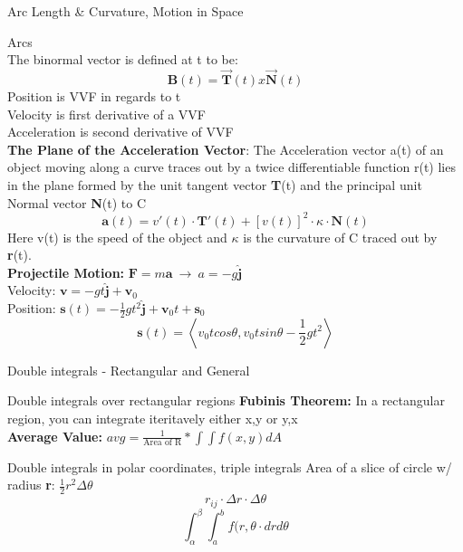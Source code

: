 \documentclass[a4paper, 12pt]{article}
\begin{document}
\begin{section}{Arc Length \& Curvature, Motion in Space}
\begin{subsection}{Arcs}
\begin{equation}
\end{equation}
The binormal vector is defined at t to be:
\begin{equation} 
	\textbf{B}(t)=\vec{\textbf{T}}(t) x \vec{\textbf{N}}(t)
\end{equation}
Position is VVF in regards to t\\
Velocity is first derivative of a VVF\\
Acceleration is second derivative of VVF\\
\textbf{The Plane of the Acceleration Vector}: The Acceleration vector a(t) of an object moving
along a curve traces out by a twice differentiable function r(t) lies in the plane formed by
the unit tangent vector \textbf{T}(t) and the principal unit Normal vector \textbf{N}(t) to C
\begin{equation} 
\textbf{a}(t)=v'(t)\cdot \textbf{T}'(t)+\left[v(t)\right]^{2}\cdot\kappa\cdot\textbf{N}(t)
\end{equation}
Here v(t) is the speed of the object and $\kappa$ is the curvature of C traced out by 
\textbf{r}(t).\\
\textbf{Projectile Motion:} $\textbf{F}=m\textbf{a} ~\to~a=-g\hat{\textbf{j}}$\\
Velocity: $\textbf{v}=-gt\hat{\textbf{j}}+\textbf{v}_{0}$ \\
Position: $\textbf{s}(t)=-\frac{1}{2}gt^{2}\hat{\textbf{j}}+\textbf{v}_{0}t+\textbf{s}_{0}$\\
\begin{equation} 
	\textbf{s}(t)=\left<v_0tcos\theta,v_0tsin\theta-\frac{1}{2}gt^{2}\right>
\end{equation}
\end{subsection}
\end{section}
\begin{section}{Double integrals - Rectangular and General}
\begin{subsection}{Double integrals over rectangular regions}
\textbf{Fubinis Theorem:} In a rectangular region, you can integrate 
iteritavely either x,y or y,x \\
\textbf{Average Value:} $avg=\frac{1}{\mbox{Area of R}}*\int\int f(x,y)dA$
\end{subsection}
\end{section}
\begin{section}{Double integrals in polar coordinates, triple integrals}
Area of a slice of circle w/ radius \textbf{r}: $\frac{1}{2}r^{2}\Delta\theta$ \\
\begin{equation}
r_{ij}\cdot\Delta r\cdot\Delta\theta
\end{equation}
\begin{equation} 
\int_{\alpha}^{\beta}\int_{a}^{b}f(r,\theta\cdot drd\theta
\end{equation}

\end{section}
\end{document}
